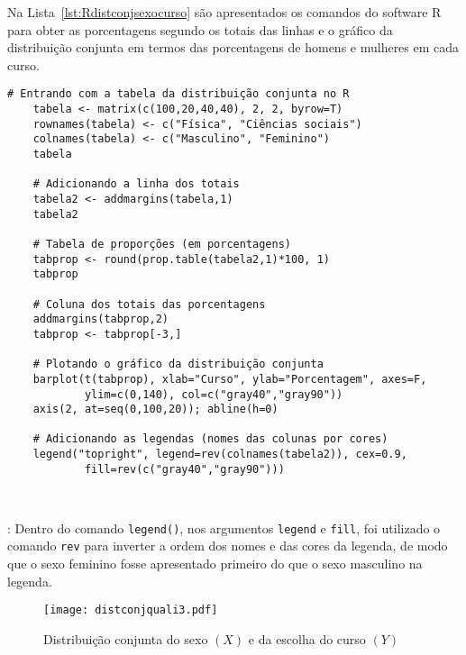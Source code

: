 \documentclass[11pt,fleqn]{book} %
\begin{document}
\vspace{0,3cm}

Na Lista~\ref{lst:Rdistconjsexocurso} são apresentados os comandos do software R para obter as porcentagens segundo os totais das linhas e o gráfico da distribuição conjunta em termos das porcentagens de homens e mulheres em cada curso.\\

\begin{scriptsize}
	\estiloR
	\begin{lstlisting}[caption={Comandos do software R}, label=lst:Rdistconjsexocurso]
	# Entrando com a tabela da distribuição conjunta no R
	tabela <- matrix(c(100,20,40,40), 2, 2, byrow=T)
	rownames(tabela) <- c("Física", "Ciências sociais")
	colnames(tabela) <- c("Masculino", "Feminino")
	tabela

	# Adicionando a linha dos totais
	tabela2 <- addmargins(tabela,1)
	tabela2

	# Tabela de proporções (em porcentagens)
	tabprop <- round(prop.table(tabela2,1)*100, 1)
	tabprop

	# Coluna dos totais das porcentagens
	addmargins(tabprop,2)
	tabprop <- tabprop[-3,]

	# Plotando o gráfico da distribuição conjunta
	barplot(t(tabprop), xlab="Curso", ylab="Porcentagem", axes=F, 
			ylim=c(0,140), col=c("gray40","gray90"))
	axis(2, at=seq(0,100,20)); abline(h=0)
	
	# Adicionando as legendas (nomes das colunas por cores)
	legend("topright", legend=rev(colnames(tabela2)), cex=0.9,
			fill=rev(c("gray40","gray90")))

	
	\end{lstlisting}
\end{scriptsize}

: Dentro do comando \texttt{legend()}, nos argumentos \texttt{legend} e \texttt{fill}, foi utilizado o comando \texttt{rev} para inverter a ordem dos nomes e das cores da legenda, de modo que o sexo feminino fosse apresentado primeiro do que o sexo masculino na legenda. \\

\begin{figure}[h!]
\vspace{0,3cm}
\centering\texttt{[image: distconjquali3.pdf]}
\setlength{\abovecaptionskip}{0.5pt}
\caption{Distribuição conjunta do sexo $(X)$ e da escolha do curso $(Y)$}
\label{fig:distconjsexocurso2} %
\vspace{0.5cm}
\end{figure}
\end{document}
